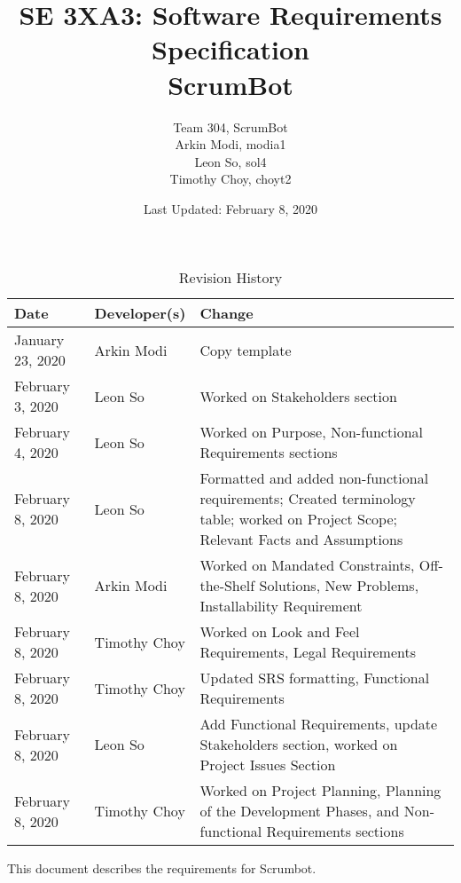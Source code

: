 \documentclass[12pt, titlepage]{article}
\title{SE 3XA3: Software Requirements Specification\\ScrumBot}
\author{
    Team 304, ScrumBot
        \\ Arkin Modi, modia1
        \\ Leon So, sol4
        \\ Timothy Choy, choyt2
}
\date{Last Updated: February 8, 2020}
\begin{document}
\maketitle

\tableofcontents
\listoftables
\listoffigures

\newpage

\begin{table}[!hbp]
    \caption{Revision History} \label{TblRevisionHistory}
    \begin{tabularx}{\textwidth}{llX}
        \toprule
            \textbf{Date} & \textbf{Developer(s)} & \textbf{Change}\\
        \midrule
            January 23, 2020 & Arkin Modi & Copy template\\
            February 3, 2020 & Leon So & Worked on Stakeholders section\\
            February 4, 2020 & Leon So & Worked on Purpose, Non-functional Requirements sections\\
            February 8, 2020 & Leon So & Formatted and added non-functional requirements; Created terminology table; worked on Project Scope; Relevant Facts and Assumptions\\
            February 8, 2020 & Arkin Modi & Worked on Mandated Constraints, Off-the-Shelf Solutions, New Problems, Installability Requirement\\
            February 8, 2020 & Timothy Choy & Worked on Look and Feel Requirements, Legal Requirements\\
            February 8, 2020 & Timothy Choy & Updated SRS formatting, Functional Requirements\\
            February 8, 2020 & Leon So & Add Functional Requirements, update Stakeholders section, worked on Project Issues Section\\
            February 8, 2020 & Timothy Choy & Worked on Project Planning, Planning of the Development Phases, and Non-functional Requirements sections\\
        \bottomrule
    \end{tabularx}
\end{table}

\FloatBarrier

\newpage


This document describes the requirements for Scrumbot. 
\end{document}
